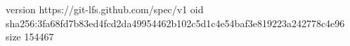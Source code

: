 version https://git-lfs.github.com/spec/v1
oid sha256:3fa68fd7b83ed4fcd2da49954462b102c5d1c4e54baf3e819223a242778c4e96
size 154467
